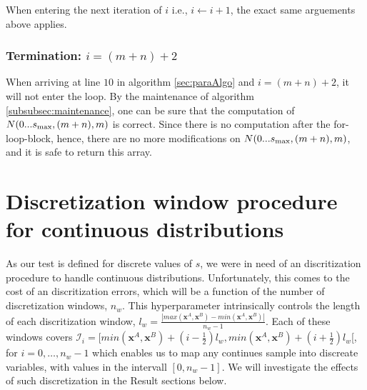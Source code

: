 \documentclass[a4paper]{article}
\begin{document}
When entering the next iteration of $i$ i.e., $i\leftarrow i+1$, the exact same arguements above applies.

\subsubsection{Termination: $i=(m+n)+2$}
When arriving at line $10$ in algorithm \ref{sec:paraAlgo} and $i=(m+n)+2$, it will not enter the loop. By the maintenance of algorithm \ref{subsubsec:maintenance}, one can be sure that the computation of $N(0...s_{\rm max},(m+n),m)$ is correct. Since there is no computation after the for-loop-block, hence, there are no more modifications on $N(0...s_{\rm max},(m+n),m)$, and it is safe to return this array.

\section{Discretization window procedure for continuous distributions}

As our test is defined for discrete values of $s$, we were in need of an discritization procedure to handle continuous distributions. Unfortunately, this comes to the cost of an discritization errors, which will be a function of the number of discretization windows, $n_{w}$. This hyperparameter intrinsically controls the length of each discritization window, $l_w=\frac{|max(\bm{x}^A,\bm{x}^B) - min(\bm{x}^A,\bm{x}^B)|}{n_{w}-1}$. Each of these windows covers $\mathcal{I}_{i}=[min(\bm{x}^A,\bm{x}^B)+(i-\frac{1}{2})l_w,min(\bm{x}^A,\bm{x}^B)+(i+\frac{1}{2})l_w$[, 
for $i=0, \ldots, n_w-1$
which enables us to map any continues sample into discreate variables, with values in the intervall $[0,n_w-1]$. We will investigate the effects of such discretization in the Result sections below.
\end{document}

